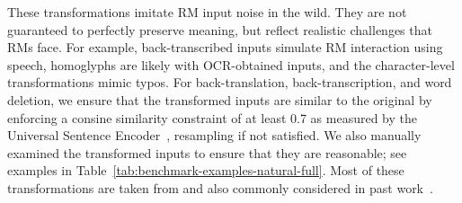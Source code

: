 These transformations imitate RM input noise in the wild. They are not guaranteed to perfectly preserve meaning, but reflect realistic challenges that RMs face. For example, back-transcribed inputs simulate RM interaction using speech, homoglyphs are likely with OCR-obtained inputs, and the character-level transformations mimic typos.
For back-translation, back-transcription, and word deletion, we ensure that the transformed inputs are similar to the original by enforcing a consine similarity constraint of at least 0.7 as measured by the Universal Sentence Encoder~\citep{cer-etal-2018-universal}, resampling if not satisfied.
We also manually examined the transformed inputs to ensure that they are reasonable; see examples in Table~\ref{tab:benchmark-examples-natural-full}.
Most of these transformations are taken from \citet{morris-etal-2020-textattack} and also commonly considered in past work~.
